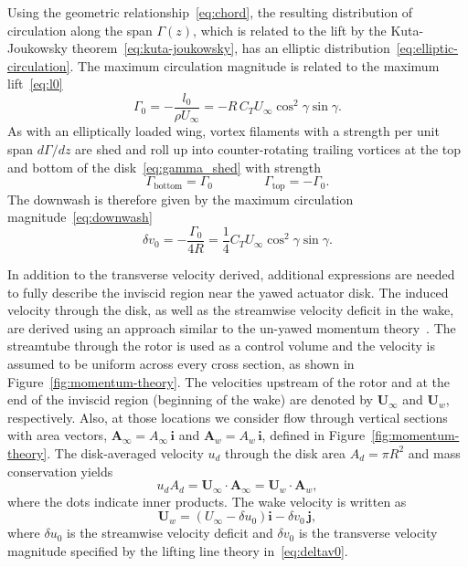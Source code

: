 Using the geometric relationship~\eqref{eq:chord}, the resulting distribution of circulation along the span $\Gamma(z)$, which is related to the lift by the Kuta-Joukowsky theorem~\eqref{eq:kuta-joukowsky}, has an elliptic distribution~\eqref{eq:elliptic-circulation}. The maximum circulation magnitude is related to the maximum lift~\eqref{eq:l0} 
\begin{equation}
\label{eq:gamma0}
\Gamma_0 = - \frac{l_0}{\rho U_\infty} = -R \, C_T U_\infty \cos^2\gamma \sin \gamma.
\end{equation}
As with an elliptically loaded wing, vortex filaments with a strength per unit span $d\Gamma/dz$ are shed and roll up into counter-rotating trailing vortices at the top and bottom of the disk~\eqref{eq:gamma_shed} with strength
\begin{equation}
\Gamma_\text{bottom} = \Gamma_0 \qquad \qquad \Gamma_\text{top} = - \Gamma_0.
\end{equation}
The downwash is therefore given by the maximum circulation magnitude~\eqref{eq:downwash}
\begin{equation}
\label{eq:deltav0}
\delta v_0 = -\frac{\Gamma_0}{4R} = \frac{1}{4} C_T U_\infty \cos^2\gamma \sin \gamma.
\end{equation}

In addition to the transverse velocity derived, additional expressions are needed to fully describe the inviscid region near the yawed actuator disk. The induced velocity through the disk, as well as the streamwise velocity deficit in the wake, are derived using an approach similar to the un-yawed momentum theory~\cite{Glauert1935a, Burton2011a}. The streamtube through the rotor is used as a control volume and the velocity is assumed to be uniform across every cross section, as shown in Figure~\ref{fig:momentum-theory}. The velocities upstream of the rotor and at the end of the inviscid region (beginning of the wake) are denoted by $\mathbf{U}_\infty$  and $\mathbf{U}_w$, respectively. Also, at those locations we consider flow through vertical sections with area vectors, $\mathbf{A}_\infty = A_\infty \, \boldsymbol{i}$ and $\mathbf{A}_w = A_w \,\boldsymbol{i}$, defined in Figure~\ref{fig:momentum-theory}. The disk-averaged velocity $u_d$ through the disk area $A_d = \pi R^2$ and mass conservation yields 
\begin{equation}
u_d A_d = \mathbf{U}_\infty \cdot \mathbf{A}_\infty  =  \mathbf{U}_w \cdot \mathbf{A}_w,
\end{equation}
where the dots indicate inner products. The wake velocity is written as 
\begin{equation}
\mathbf{U}_w = (U_\infty - \delta u_0) \boldsymbol{i} - \delta v_0 \, \boldsymbol{j},
\end{equation}
where $\delta u_0$ is the streamwise velocity deficit and $\delta v_0$ is the transverse velocity magnitude specified by the lifting line theory in~\eqref{eq:deltav0}. 


